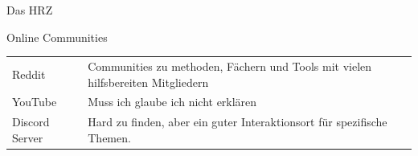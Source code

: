 \documentclass[aspectratio=169,shownotes]{beamer}
\begin{document}
\begin{frame}{Das HRZ}
    
\end{frame}

\begin{frame}{Online Communities}
    \begin{tabularx}{\linewidth}{ll}
        Reddit & Communities zu methoden, Fächern und Tools mit vielen hilfsbereiten Mitgliedern\\
        YouTube & Muss ich glaube ich nicht erklären\\
        Discord Server & Hard zu finden, aber ein guter Interaktionsort für spezifische Themen.\\

    \end{tabularx}
\end{frame}
\end{document}
